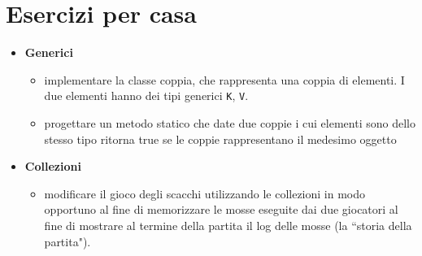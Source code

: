 \documentclass{article}
\begin{document}
%
%
%
%	
%
%
%
%
%	
%	
%
%	

\section{Esercizi per casa}
\begin{itemize}
\item \textbf{Generici}
\begin{itemize}
\item implementare la classe coppia, che rappresenta una coppia di elementi. I due elementi hanno dei tipi generici \texttt{K}, \texttt{V}.
\item progettare un metodo statico che date due coppie i cui elementi sono dello stesso tipo ritorna true se le coppie rappresentano il medesimo oggetto
\end{itemize} 
\item \textbf{Collezioni}
\begin{itemize}
\item modificare il gioco degli scacchi utilizzando le collezioni in modo opportuno al fine di memorizzare le mosse eseguite dai due giocatori al fine di mostrare al termine della partita  il log delle mosse (la ``storia della partita").
\end{itemize}
\end{itemize}
\end{document}
